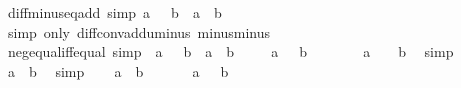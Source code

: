 \begin{isabellebody}
\endisatagproof
{\isafoldproof}%
%
\isadelimproof
\isanewline
%
\endisadelimproof
\isanewline
{}\isamarkupfalse%
\ diff{\isacharunderscore}{\kern0pt}minus{\isacharunderscore}{\kern0pt}eq{\isacharunderscore}{\kern0pt}add\ {\isacharbrackleft}{\kern0pt}simp{\isacharbrackright}{\kern0pt}{\isacharcolon}{\kern0pt}\ {\isachardoublequoteopen}a\ {\isacharminus}{\kern0pt}\ {\isacharminus}{\kern0pt}\ b\ {\isacharequal}{\kern0pt}\ a\ {\isacharplus}{\kern0pt}\ b{\isachardoublequoteclose}\isanewline
%
\isadelimproof
\ \ %
\endisadelimproof
%
\isatagproof
{}\isamarkupfalse%
\ {\isacharparenleft}{\kern0pt}simp\ only{\isacharcolon}{\kern0pt}\ diff{\isacharunderscore}{\kern0pt}conv{\isacharunderscore}{\kern0pt}add{\isacharunderscore}{\kern0pt}uminus\ minus{\isacharunderscore}{\kern0pt}minus{\isacharparenright}{\kern0pt}%
\endisatagproof
{\isafoldproof}%
%
\isadelimproof
\isanewline
%
\endisadelimproof
\isanewline
{}\isamarkupfalse%
\ neg{\isacharunderscore}{\kern0pt}equal{\isacharunderscore}{\kern0pt}iff{\isacharunderscore}{\kern0pt}equal\ {\isacharbrackleft}{\kern0pt}simp{\isacharbrackright}{\kern0pt}{\isacharcolon}{\kern0pt}\ {\isachardoublequoteopen}{\isacharminus}{\kern0pt}\ a\ {\isacharequal}{\kern0pt}\ {\isacharminus}{\kern0pt}\ b\ {\isasymlongleftrightarrow}\ a\ {\isacharequal}{\kern0pt}\ b{\isachardoublequoteclose}\isanewline
%
\isadelimproof
%
\endisadelimproof
%
\isatagproof
{}\isamarkupfalse%
\isanewline
\ \ \isamarkupfalse%
\ {\isachardoublequoteopen}{\isacharminus}{\kern0pt}\ a\ {\isacharequal}{\kern0pt}\ {\isacharminus}{\kern0pt}\ b{\isachardoublequoteclose}\isanewline
\ \ \isamarkupfalse%
\ \isamarkupfalse%
\ {\isachardoublequoteopen}{\isacharminus}{\kern0pt}\ {\isacharparenleft}{\kern0pt}{\isacharminus}{\kern0pt}\ a{\isacharparenright}{\kern0pt}\ {\isacharequal}{\kern0pt}\ {\isacharminus}{\kern0pt}\ {\isacharparenleft}{\kern0pt}{\isacharminus}{\kern0pt}\ b{\isacharparenright}{\kern0pt}{\isachardoublequoteclose}\ \isamarkupfalse%
\ simp\isanewline
\ \ \isamarkupfalse%
\ \isamarkupfalse%
\ {\isachardoublequoteopen}a\ {\isacharequal}{\kern0pt}\ b{\isachardoublequoteclose}\ \isamarkupfalse%
\ simp\isanewline
{}\isamarkupfalse%
\isanewline
\ \ \isamarkupfalse%
\ {\isachardoublequoteopen}a\ {\isacharequal}{\kern0pt}\ b{\isachardoublequoteclose}\isanewline
\ \ \isamarkupfalse%
\ \isamarkupfalse%
\ {\isachardoublequoteopen}{\isacharminus}{\kern0pt}\ a\ {\isacharequal}{\kern0pt}\ {\isacharminus}{\kern0pt}\ b{\isachardoublequoteclose}\ \isamarkupfalse%

\end{isabellebody}
